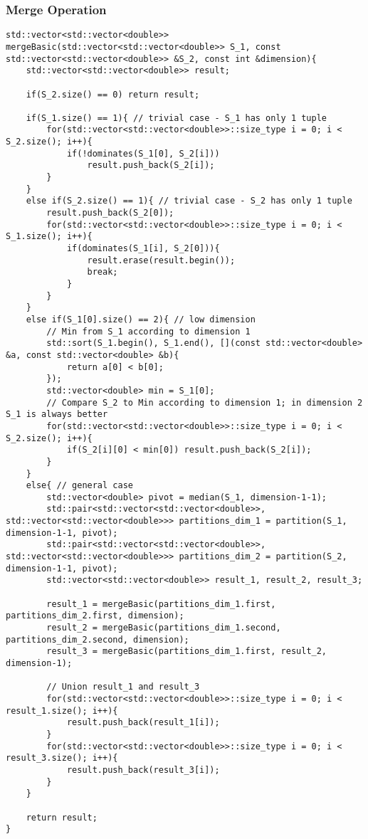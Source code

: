 \subsubsection{{\large Merge Operation}}
\begin{verbatim}
std::vector<std::vector<double>> mergeBasic(std::vector<std::vector<double>> S_1, const std::vector<std::vector<double>> &S_2, const int &dimension){
	std::vector<std::vector<double>> result;
	
	if(S_2.size() == 0) return result;
	
	if(S_1.size() == 1){ // trivial case - S_1 has only 1 tuple
		for(std::vector<std::vector<double>>::size_type i = 0; i < S_2.size(); i++){
			if(!dominates(S_1[0], S_2[i]))
				result.push_back(S_2[i]);
		}
	}
	else if(S_2.size() == 1){ // trivial case - S_2 has only 1 tuple
		result.push_back(S_2[0]);
		for(std::vector<std::vector<double>>::size_type i = 0; i < S_1.size(); i++){
			if(dominates(S_1[i], S_2[0])){
				result.erase(result.begin());
				break;
			}
		}
	}
	else if(S_1[0].size() == 2){ // low dimension
		// Min from S_1 according to dimension 1
		std::sort(S_1.begin(), S_1.end(), [](const std::vector<double> &a, const std::vector<double> &b){
			return a[0] < b[0];
		});
		std::vector<double> min = S_1[0];
		// Compare S_2 to Min according to dimension 1; in dimension 2 S_1 is always better
		for(std::vector<std::vector<double>>::size_type i = 0; i < S_2.size(); i++){
			if(S_2[i][0] < min[0]) result.push_back(S_2[i]);
		}
	}
	else{ // general case
		std::vector<double> pivot = median(S_1, dimension-1-1);
		std::pair<std::vector<std::vector<double>>, std::vector<std::vector<double>>> partitions_dim_1 = partition(S_1, dimension-1-1, pivot);
		std::pair<std::vector<std::vector<double>>, std::vector<std::vector<double>>> partitions_dim_2 = partition(S_2, dimension-1-1, pivot);
		std::vector<std::vector<double>> result_1, result_2, result_3;
		
		result_1 = mergeBasic(partitions_dim_1.first, partitions_dim_2.first, dimension);
		result_2 = mergeBasic(partitions_dim_1.second, partitions_dim_2.second, dimension);
		result_3 = mergeBasic(partitions_dim_1.first, result_2, dimension-1);
		
		// Union result_1 and result_3
		for(std::vector<std::vector<double>>::size_type i = 0; i < result_1.size(); i++){
			result.push_back(result_1[i]);
		}
		for(std::vector<std::vector<double>>::size_type i = 0; i < result_3.size(); i++){
			result.push_back(result_3[i]);
		}
	}
	
	return result;
}
\end{verbatim}

